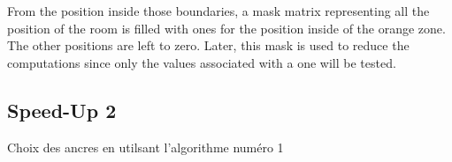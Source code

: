 From the position inside those boundaries, a mask matrix representing all the position of the room is filled with ones for the position inside of the orange zone. The other positions are left to zero. Later, this mask is used to reduce the computations since only the values associated with a one will be tested.

\subsection{Speed-Up 2}

Choix des ancres en utilsant l'algorithme numéro 1


